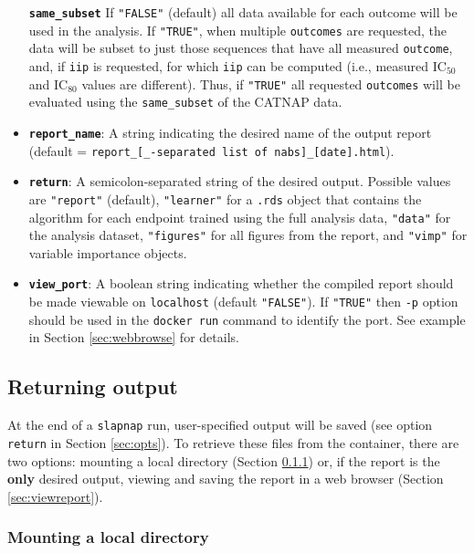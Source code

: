 \documentclass[]{article}
\begin{document}
\begin{itemize}
  \textbf{\texttt{same\_subset}} If \texttt{"FALSE"} (default) all data
  available for each outcome will be used in the analysis. If
  \texttt{"TRUE"}, when multiple \texttt{outcomes} are requested, the
  data will be subset to just those sequences that have all measured
  \texttt{outcome}, and, if \texttt{iip} is requested, for which
  \texttt{iip} can be computed (i.e., measured IC\(_{50}\) and
  IC\(_{80}\) values are different). Thus, if \texttt{"TRUE"} all
  requested \texttt{outcomes} will be evaluated using the
  \texttt{same\_subset} of the CATNAP data.
\item
  \textbf{\texttt{report\_name}}: A string indicating the desired name
  of the output report (default =
  \texttt{report\_{[}\_-separated\ list\ of\ nabs{]}\_{[}date{]}.html}).
\item
  \textbf{\texttt{return}}: A semicolon-separated string of the desired
  output. Possible values are \texttt{"report"} (default),
  \texttt{"learner"} for a \texttt{.rds} object that contains the
  algorithm for each endpoint trained using the full analysis data,
  \texttt{"data"} for the analysis dataset, \texttt{"figures"} for all
  figures from the report, and \texttt{"vimp"} for variable importance
  objects.
\item
  \textbf{\texttt{view\_port}}: A boolean string indicating whether the
  compiled report should be made viewable on \texttt{localhost} (default
  \texttt{"FALSE"}). If \texttt{"TRUE"} then \texttt{-p} option should
  be used in the \texttt{docker\ run} command to identify the port. See
  example in Section \ref{sec:webbrowse} for details.
\end{itemize}

\subsection{Returning output}\label{returning-output}

At the end of a \texttt{slapnap} run, user-specified output will be
saved (see option \texttt{return} in Section \ref{sec:opts}). To
retrieve these files from the container, there are two options: mounting
a local directory (Section \ref{sec:mounting}) or, if the report is the
\textbf{only} desired output, viewing and saving the report in a web
browser (Section \ref{sec:viewreport}).

\subsubsection{Mounting a local directory}\label{sec:mounting}
\end{document}
